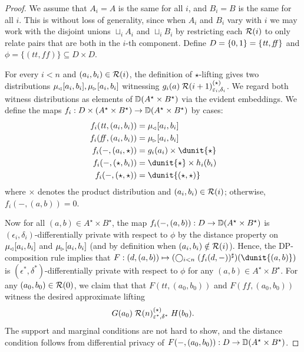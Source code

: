 \documentclass{lmcs}
\begin{document}
\begin{proof}
  We assume that $A_i = A$ is the same for all $i$, and $B_i = B$ is the same
  for all $i$. This is without loss of generality, since when $A_i$ and $B_i$
  vary with $i$ we may work with the disjoint unions $\sqcup_i A_i$ and
  $\sqcup_i B_i$ by restricting each $\mathcal{R}(i)$ to only relate pairs that are both
  in the $i$-th component. Define $D = {\{0, 1\}} = \{ \mathit{tt}, \mathit{ff} \}$ and
  $\phi = \{ (\mathit{tt}, \mathit{ff}) \} \subseteq D \times D$.
  
  For every $i < n$ and $(a_i, b_i) \in \mathcal{R}(i)$, the definition of
  $\star$-lifting gives two distributions $\mu_{\mspace{-1.5mu}{\scriptscriptstyle \vartriangleleft}}[a_i, b_i], \mu_{\mspace{-1.5mu}{\scriptscriptstyle \vartriangleright}}[a_i,
  b_i]$ witnessing $g_i(a) \mathrel{\mathrel{\mathcal{R}(i + 1)^{(\star)}_{\varepsilon_i,
  \delta_i}}}$.  We regard both witness distributions as elements of
  ${\mathbb{D}}(A^\star \times B^\star)$ via the evident embeddings. We define the maps
  $f_i : D \times (A^\star \times B^\star) \to {\mathbb{D}}(A^\star \times B^\star)$ by
  cases:
  \begin{align*}
    f_i(\mathit{tt}, (a_i, b_i)) &= \mu\lside[a_i, b_i] \\
    f_i(\mathit{ff}, (a_i, b_i)) &= \mu\rside[a_i, b_i] \\
    f_i(-, (a_i, \star)) &= g_i(a_i) \times \dunit{\star} \\
    f_i(-, (\star, b_i)) &= \dunit{\star} \times h_i(b_i) \\
    f_i(-, (\star, \star)) &= \dunit{(\star, \star)}
  \end{align*}
  where $\times$ denotes the product distribution and $(a_i, b_i) \in \mathcal{R}(i)$;
  otherwise, $f_i(-, (a, b)) = 0$.
  
  Now for all $(a, b) \in A^\star \times B^\star$, the map $f_i(-, (a, b)) : D
  \to {\mathbb{D}}(A^\star \times B^\star)$ is $(\epsilon_i, \delta_i)$-differentially
  private with respect to $\phi$ by the distance property on $\mu_{\mspace{-1.5mu}{\scriptscriptstyle \vartriangleleft}}[a_i,
  b_i]$ and $\mu_{\mspace{-1.5mu}{\scriptscriptstyle \vartriangleright}}[a_i, b_i]$ (and by definition when $(a_i, b_i) \notin
  \mathcal{R}(i)$). Hence, the DP-composition rule implies that $F : (d, (a, b)) \mapsto
  ( \bigcirc_{i < n} \lift{(f_i(d,-))})(\dunit{(a, b)})$ is $(\epsilon^*,
  \delta^*)$-differentially private with respect to $\phi$ for any $(a, b) \in
  A^\star \times B^\star$.  For any $(a_0, b_0) \in \mathcal{R}(0)$, we claim that
  that $F(\mathit{tt}, (a_0, b_0))$ and $F(\mathit{ff}, (a_0, b_0))$ witness the
  desired approximate lifting
  \[
    G(a_0) \mathrel{\mathrel{\mathcal{R}(n)^{(\star)}_{\varepsilon^*, \delta^*}}} H(b_0) .
  \]
  The support and marginal conditions are not hard to show, and the distance
  condition follows from differential privacy of $F(-, (a_0, b_0)) : D \to
  {\mathbb{D}}(A^\star \times B^\star)$.
\end{proof}
\end{document}
